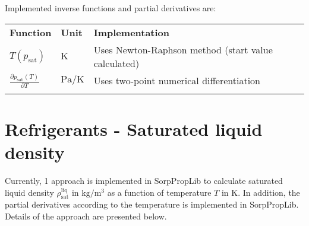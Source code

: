 %
Implemented inverse functions and partial derivatives are:
%
\begin{longtable}[l]{l|l|l}
	\toprule
	\addlinespace
	\textbf{Function} & \textbf{Unit} &	\textbf{Implementation} \\
	\addlinespace
	\midrule
	\endhead
	
	\bottomrule
	\endfoot
	\bottomrule
	\endlastfoot
	\addlinespace
	
	$T(p_\mathrm{sat})$	& $\si{\kelvin}$ & Uses Newton-Raphson method (start value calculated) \\
	$\frac{\partial p_\mathrm{sat}(T)}{\partial T}$	& $\si{\pascal\per\kelvin}$ & Uses two-point numerical differentiation\\
	
	\addlinespace
\end{longtable}
%
\section{Refrigerants - Saturated liquid density}
\label{cha:approaches:refd}
%
Currently, 1 approach is implemented in SorpPropLib to calculate saturated liquid density $\rho_\mathrm{sat}^{\mathrm{liq}}$ in $\si{\kilogram\per\cubic\meter}$ as a function of temperature $T$ in $\si{\kelvin}$. In addition, the partial derivatives according to the temperature is implemented in SorpPropLib. Details of the approach are presented below.
